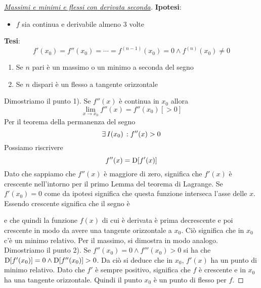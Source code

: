 \begin{proof}
  [\protect\hyperlink{teor:der:Sec:1}{Massimi e minimi e flessi con derivata seconda}]
  \textbf{Ipotesi}:
  \begin{itemize}
    \item $f$ sia continua e derivabile almeno 3 volte
  \end{itemize}
  \textbf{Tesi}:
  \begin{equation*}
    f'(x_0)=f''(x_0)=\dotsb=f^{(n-1)}(x_0)=0\land f^{(n)}(x_0)\neq0
  \end{equation*}
  \begin{enumerate}
    \item Se $n$ pari è un massimo o un minimo a seconda del segno
    \item Se $n$ dispari è un flesso a tangente orizzontale
  \end{enumerate}
  \divisor

  Dimostriamo il punto 1). Se $f''(x)$ è continua in $x_0$ allora
  \begin{equation*}
    \lim\limits_{x\to x_0} f''(x) = f''(x_0)[>0]
  \end{equation*}
  Per il teorema della permanenza del segno
  \begin{equation*}
    \exists\,I(x_0)\,: f''(x)>0
  \end{equation*}
  Possiamo riscrivere
  \begin{equation*}
    f''(x) = \mathop{}\!\mathrm{D}[f'(x)]
  \end{equation*}
  Dato che sappiamo che $f''(x)$ è maggiore di zero, significa che $f'(x)$ è crescente nell'intorno
  per il primo Lemma del teorema di Lagrange. Se $f'(x_0) = 0$ come da ipotesi significa che questa
  funzione interseca l'asse delle $x$. Essendo crescente significa che il segno è
  \begin{center}
    \end{center}
    e che quindi la funzione $f(x)$ di cui è derivata è prima decrescente e poi crescente in modo
    da avere una tangente orizzontale a $x_0$. Ciò significa che in $x_0$ c'è un minimo relativo. Per
    il massimo, si dimostra in modo analogo.\\ [\baselineskip]
    Dimostriamo il punto 2). Se $f''(x_0)=0\land f'''(x_0)>0$ si ha che 
    $\mathop{}\!\mathrm{D}[f'(x_0)]=0\land\mathop{}\!\mathrm{D}[f''(x_0)]>0$. Da ciò si deduce che in $x_0$, $f'(x)$ ha un punto di
    minimo relativo. Dato che $f'$ è sempre positivo, significa che $f$ è crescente e in $x_0$ ha
    una tangente orizzontale. Quindi il punto $x_0$ è un punto di flesso per $f$.
  \end{proof}

